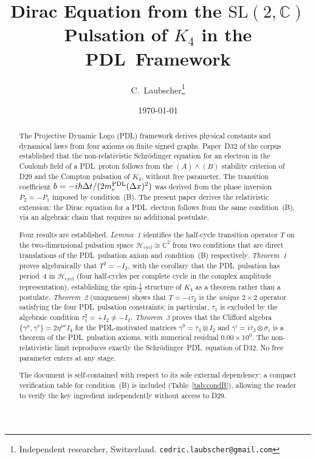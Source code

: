 \documentclass[11pt,a4paper]{article}
\theoremstyle{definition}
\newcommand{\PDL}{\textnormal{PDL}}
\newcommand{\hb}{\hbar}
\newcommand{\mePDL}{m_e^{\PDL}}
\newcommand{\Hcycl}{\mathcal{H}_{\mathrm{cycl}}}
\newcommand{\Kfour}{K_4}
\begin{document}
\title{Dirac Equation from the $\mathrm{SL}(2,\mathbb{C})$ Pulsation of $K_4$ in the \PDL\ Framework}
\author{C.~Laubscher\thanks{Independent researcher, Switzerland. \texttt{cedric.laubscher@gmail.com}}}
\date{\small \today}
\maketitle

\begin{abstract}
The Projective Dynamic Logo (\PDL) framework derives physical constants and dynamical laws from four axioms on finite signed graphs. Paper~D32 of the corpus established that the non-relativistic Schr\"odinger equation for an electron in the Coulomb field of a \PDL\ proton follows from the $(A)\wedge(B)$ stability criterion of D29 and the Compton pulsation of $\Kfour$, without free parameter. The transition coefficient $b = -i\hb\Delta t/(2\mePDL(\Delta x)^2)$ was derived from the phase inversion $P_2 = -P_1$ imposed by condition~(B). The present paper derives the relativistic extension: the Dirac equation for a \PDL\ electron follows from the same condition~(B), via an algebraic chain that requires no additional postulate.

Four results are established. \emph{Lemma~1} identifies the half-cycle transition operator $T$ on the two-dimensional pulsation space $\Hcycl \cong \mathbb{C}^2$ from two conditions that are direct translations of the \PDL\ pulsation axiom and condition~(B) respectively. \emph{Theorem~1} proves algebraically that $T^2 = -I_2$, with the corollary that the \PDL\ pulsation has period~4 in $\Hcycl$ (four half-cycles per complete cycle in the complex amplitude representation), establishing the spin-$\tfrac{1}{2}$ structure of $\Kfour$ as a theorem rather than a postulate. \emph{Theorem~2} (uniqueness) shows that $T = -i\tau_2$ is the \emph{unique} $2\times2$ operator satisfying the four \PDL\ pulsation constraints; in particular, $\tau_1$ is excluded by the algebraic condition $\tau_1^2 = +I_2 \neq -I_2$. \emph{Theorem~3} proves that the Clifford algebra $\{\gamma^\mu, \gamma^\nu\} = 2\eta^{\mu\nu}I_4$ for the \PDL-motivated matrices $\gamma^0 = \tau_3 \otimes I_2$ and $\gamma^i = i\tau_2 \otimes \sigma_i$ is a theorem of the \PDL\ pulsation axioms, with numerical residual $0.00\times10^0$. The non-relativistic limit reproduces exactly the Schr\"odinger--\PDL\ equation of D32. No free parameter enters at any stage.

The document is self-contained with respect to its sole external dependency: a compact verification table for condition~(B) is included (Table~\ref{tab:condB}), allowing the reader to verify the key ingredient independently without access to D29.
\end{abstract}
\end{document}
